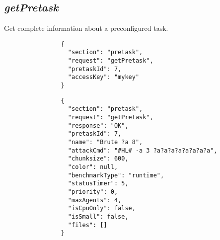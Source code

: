 	\subsection*{\textit{getPretask}}
		Get complete information about a preconfigured task.
			{
				\color{blue}
				\begin{verbatim}
				{
				  "section": "pretask",
				  "request": "getPretask",
				  "pretaskId": 7,
				  "accessKey": "mykey"
				}
				\end{verbatim}
			}
			{
				\color{OliveGreen}
				\begin{verbatim}
				{
				  "section": "pretask",
				  "request": "getPretask",
				  "response": "OK",
				  "pretaskId": 7,
				  "name": "Brute ?a 8",
				  "attackCmd": "#HL# -a 3 ?a?a?a?a?a?a?a?a",
				  "chunksize": 600,
				  "color": null,
				  "benchmarkType": "runtime",
				  "statusTimer": 5,
				  "priority": 0,
				  "maxAgents": 4,
				  "isCpuOnly": false,
				  "isSmall": false,
				  "files": []
				}
				\end{verbatim}
			}